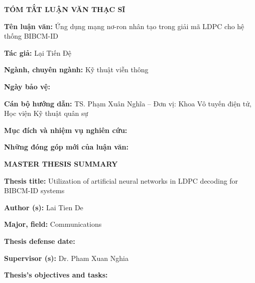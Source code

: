 \documentclass[a4paper,14pt]{extreport}
\begin{document}

\newpage
\renewcommand{\contentsname}{TABLE OF CONTENTS}
\tableofcontents

\newpage
{}
\begin{center}
    {\Large\textbf{TÓM TẮT LUẬN VĂN THẠC SĨ}}
\end{center}

\noindent\textbf{Tên luận văn:} Ứng dụng mạng nơ-ron nhân tạo trong giải mã LDPC cho hệ thống BIBCM-ID

\noindent\textbf{Tác giả:} Lại Tiến Đệ

\noindent\textbf{Ngành, chuyên ngành:} Kỹ thuật viễn thông

\noindent\textbf{Ngày bảo vệ:}

\noindent\textbf{Cán bộ hướng dẫn:} TS. Phạm Xuân Nghĩa -- Đơn vị: Khoa Vô tuyến điện tử, Học viện Kỹ thuật quân sự

\noindent\textbf{Mục đích và nhiệm vụ nghiên cứu:}

\noindent\textbf{Những đóng góp mới của luận văn:}

\newpage
{}
\begin{center}
    {\Large\textbf{MASTER THESIS SUMMARY}}
\end{center}

\noindent\textbf{Thesis title:} Utilization of artificial neural networks in LDPC decoding for BIBCM-ID systems

\noindent\textbf{Author (s):} Lai Tien De

\noindent\textbf{Major, field:} Communications

\noindent\textbf{Thesis defense date:}

\noindent\textbf{Supervisor (s):} Dr. Pham Xuan Nghia

\noindent\textbf{Thesis's objectives and tasks:}
\end{document}
